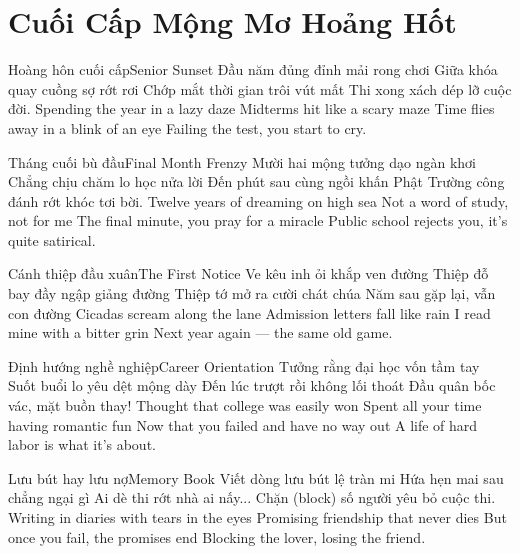 \chapter{Cuối Cấp Mộng Mơ Hoảng Hốt}

\begin{tutuyetbox}{Hoàng hôn cuối cấp}{Senior Sunset}
Đầu năm đủng đỉnh mải rong chơi
Giữa khóa quay cuồng sợ rớt rơi
Chớp mắt thời gian trôi vút mất
Thi xong xách dép lỡ cuộc đời.
\tcblower
Spending the year in a lazy daze 
Midterms hit like a scary maze 
Time flies away in a blink of an eye 
Failing the test, you start to cry.
\end{tutuyetbox}

\begin{tutuyetbox}{Tháng cuối bù đầu}{Final Month Frenzy}
Mười hai mộng tưởng dạo ngàn khơi
Chẳng chịu chăm lo học nửa lời
Đến phút sau cùng ngồi khấn Phật
Trường công đánh rớt khóc tơi bời.
\tcblower
Twelve years of dreaming on high sea 
Not a word of study, not for me 
The final minute, you pray for a miracle 
Public school rejects you, it's quite satirical.
\end{tutuyetbox}

\begin{tutuyetbox}{Cánh thiệp đầu xuân}{The First Notice}
Ve kêu inh ỏi khắp ven đường
Thiệp đỗ bay đầy ngập giảng đường
Thiệp tớ mở ra cười chát chúa
Năm sau gặp lại, vẫn con đường
\tcblower
Cicadas scream along the lane
Admission letters fall like rain
I read mine with a bitter grin
Next year again — the same old game.
\end{tutuyetbox}

\begin{tutuyetbox}{Định hướng nghề nghiệp}{Career Orientation}
Tưởng rằng đại học vốn tầm tay
Suốt buổi lo yêu dệt mộng dày
Đến lúc trượt rồi không lối thoát
Đầu quân bốc vác, mặt buồn thay!
\tcblower
Thought that college was easily won
Spent all your time having romantic fun
Now that you failed and have no way out
A life of hard labor is what it's about.
\end{tutuyetbox}

\begin{tutuyetbox}{Lưu bút hay lưu nợ}{Memory Book}
Viết dòng lưu bút lệ tràn mi
Hứa hẹn mai sau chẳng ngại gì
Ai dè thi rớt nhà ai nấy...
Chặn (block) số người yêu bỏ cuộc thi.
\tcblower
Writing in diaries with tears in the eyes
Promising friendship that never dies
But once you fail, the promises end
Blocking the lover, losing the friend.
\end{tutuyetbox}

